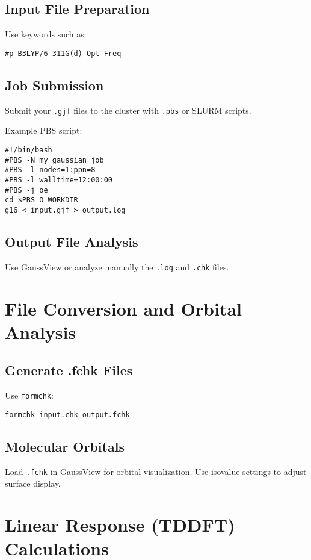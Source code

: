 \subsection*{Input File Preparation}
Use keywords such as:

\begin{verbatim}
#p B3LYP/6-311G(d) Opt Freq
\end{verbatim}

\subsection*{Job Submission}
Submit your \texttt{.gjf} files to the cluster with \texttt{.pbs} or SLURM scripts.

Example PBS script:

\begin{verbatim}
#!/bin/bash
#PBS -N my_gaussian_job
#PBS -l nodes=1:ppn=8
#PBS -l walltime=12:00:00
#PBS -j oe
cd $PBS_O_WORKDIR
g16 < input.gjf > output.log
\end{verbatim}

\subsection*{Output File Analysis}
Use GaussView or analyze manually the \texttt{.log} and \texttt{.chk} files.

\section{File Conversion and Orbital Analysis}

\subsection*{Generate .fchk Files}
Use \texttt{formchk}:

\begin{verbatim}
formchk input.chk output.fchk
\end{verbatim}

\subsection*{Molecular Orbitals}
Load \texttt{.fchk} in GaussView for orbital visualization. Use isovalue settings to adjust surface display.

\section{Linear Response (TDDFT) Calculations}

